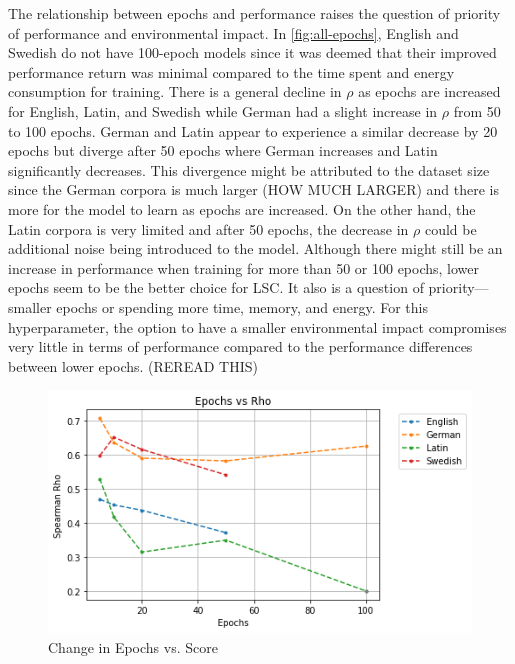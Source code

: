 The relationship between epochs and performance raises the question of priority of performance and environmental impact. In \autoref{fig:all-epochs}, English and Swedish do not have 100-epoch models since it was deemed that their improved performance return was minimal compared to the time spent and energy consumption for training. There is a general decline in $\rho$ as epochs are increased for English, Latin, and Swedish while German had a slight increase in $\rho$ from 50 to 100 epochs. German and Latin appear to experience a similar decrease by 20 epochs but diverge after 50 epochs where German increases and Latin significantly decreases. This divergence might be attributed to the dataset size since the German corpora is much larger (HOW MUCH LARGER) and there is more for the model to learn as epochs are increased. On the other hand, the Latin corpora is very limited and after 50 epochs, the decrease in $\rho$ could be additional noise being introduced to the model. Although there might still be an increase in performance when training for more than 50 or 100 epochs, lower epochs seem to be the better choice for LSC. It also is a question of priority—smaller epochs or spending more time, memory, and energy. For this hyperparameter, the option to have a smaller environmental impact compromises very little in terms of performance compared to the performance differences between lower epochs. (REREAD THIS) 

\begin{figure}[h]
  \centering
  \includegraphics[width=.8\linewidth]{sections/figures/epochs_all.png}
  \caption{Change in Epochs vs. Score}
  \label{fig:all-epochs}
\end{figure}

